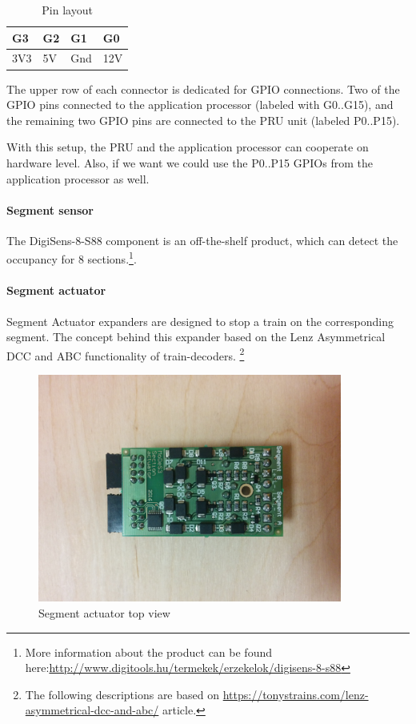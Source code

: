 \begin{table}
	\caption{Pin layout}
	\label{table:expander_pin_layout}
	\begin{center}
		\renewcommand{\arraystretch}{1.8}
		\begin{tabu} to 0.3\textwidth { | X[c] | X[c] | X[c] | X[c] |}
			\hline
			G3 & G2 & G1 & G0 \\
			\hline
			3V3  & 5V  & Gnd  & 12V\\
			\hline
		\end{tabu}
	\end{center}
\end{table} 

The upper row of each connector is dedicated for GPIO connections. Two of the GPIO pins connected to the application processor (labeled with G0..G15), and the remaining two GPIO pins are connected to the PRU unit (labeled P0..P15).

With this setup, the PRU and the application processor can cooperate on hardware level. Also, if we want we could use the P0..P15 GPIOs from the application processor as well.

\paragraph{Segment sensor}\label{paragraph:SegmentSensor}
 The DigiSens-8-S88 component is an off-the-shelf product, which can detect the occupancy for 8 sections.\footnote{More information about the product can be found here:\url{http://www.digitools.hu/termekek/erzekelok/digisens-8-s88}}.

\paragraph{Segment actuator}
Segment Actuator expanders are designed to stop a train on the corresponding segment. The concept behind this expander based on the Lenz Asymmetrical DCC and ABC functionality of train-decoders. \footnote{The following descriptions are based on \url{https://tonystrains.com/lenz-asymmetrical-dcc-and-abc/} article.}

\begin{figure}[!ht]
	\centering
	\includegraphics[width=100mm]{figures/modes3/segment-top.jpg}
	\caption{Segment actuator top view}
	\label{fig:segmentTop}
\end{figure}

